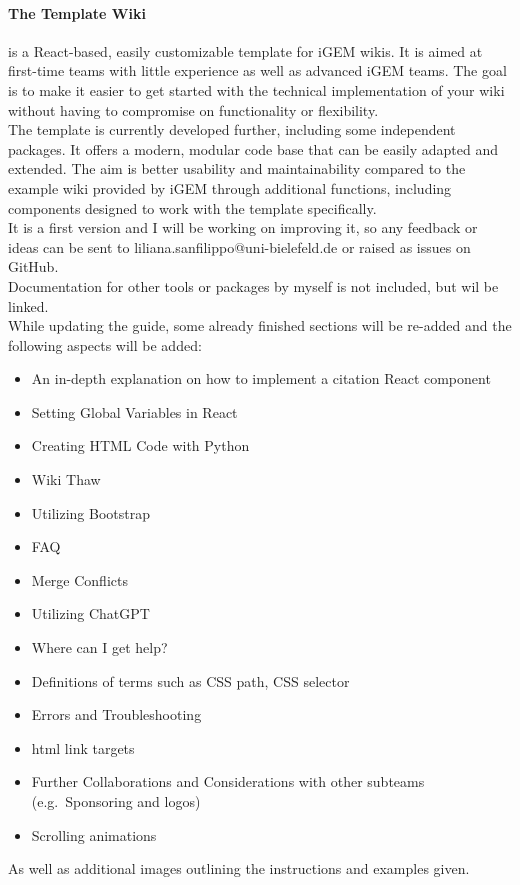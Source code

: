\documentclass[a4paper, 11pt, twoside]{book}
\begin{document}
\paragraph{The Template Wiki} is a React-based, easily customizable template for iGEM wikis.
It is aimed at first-time teams with little experience as well as advanced iGEM teams.
The goal is to make it easier to get started with the technical implementation of your wiki without having to compromise on functionality or flexibility. \\ \newline
The template is currently developed further, including some independent packages.
It offers a modern, modular code base that can be easily adapted and extended.
The aim is better usability and maintainability compared to the example wiki provided by iGEM through additional functions, including components designed to work with the template specifically. \\ \newline
It is a first version and I will be working on improving it, so any feedback or ideas can be sent to liliana.sanfilippo@uni-bielefeld.de or raised as issues on GitHub. \\ \newline
Documentation for other tools or packages by myself is not included, but wil be linked. \\ \newline
While updating the guide, some already finished sections will be re-added and the following aspects will be added:
\begin{itemize}
    \item An in-depth explanation on how to implement a citation React component
    \item Setting Global Variables in React
    \item Creating HTML Code with Python
    \item Wiki Thaw
    \item Utilizing Bootstrap
    \item FAQ
    \item Merge Conflicts
    \item Utilizing ChatGPT
    \item Where can I get help?
    \item Definitions of terms such as CSS path, CSS selector
    \item Errors and Troubleshooting
    \item html link targets
    \item Further Collaborations and Considerations with other subteams (e.g.\ Sponsoring and logos)
    \item Scrolling animations
\end{itemize}
As well as additional images outlining the instructions and examples given.
\newpage
\end{document}
